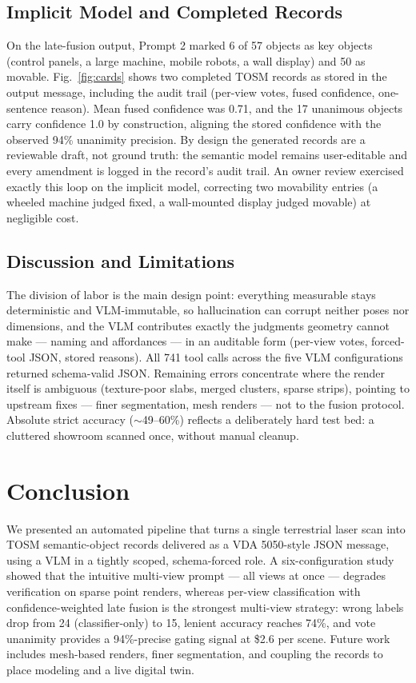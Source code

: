 \documentclass[conference]{IEEEtran}
\begin{document}
\subsection{Implicit Model and Completed Records}
On the late-fusion output, Prompt 2 marked 6 of 57 objects as key objects
(control panels, a large machine, mobile robots, a wall display) and 50 as
movable. Fig.~\ref{fig:cards} shows two completed TOSM records as stored in
the output message, including the audit trail (per-view votes, fused
confidence, one-sentence reason). Mean fused confidence was 0.71, and the
17 unanimous objects carry confidence 1.0 by construction, aligning the
stored confidence with the observed 94\% unanimity precision. By design
the generated records are a reviewable draft, not ground truth: the
semantic model remains user-editable and every amendment is logged in the
record's audit trail. An owner review exercised exactly this loop on the
implicit model, correcting two movability entries (a wheeled machine
judged fixed, a wall-mounted display judged movable) at negligible cost.

\subsection{Discussion and Limitations}
The division of labor is the main design point: everything measurable stays
deterministic and VLM-immutable, so hallucination can corrupt neither poses
nor dimensions, and the VLM contributes exactly the judgments geometry
cannot make --- naming and affordances --- in an auditable form (per-view
votes, forced-tool JSON, stored reasons). All 741 tool calls
across the five VLM configurations returned schema-valid
JSON. Remaining errors concentrate where the render itself is ambiguous
(texture-poor slabs, merged clusters, sparse strips), pointing to upstream
fixes --- finer segmentation, mesh renders --- not to the fusion protocol.
Absolute strict accuracy ($\sim$49--60\%) reflects a deliberately hard
test bed: a cluttered showroom scanned once, without manual cleanup.

\section{Conclusion}
We presented an automated pipeline that turns a single terrestrial laser
scan into TOSM semantic-object records delivered as a VDA 5050-style JSON
message, using a VLM in a tightly scoped, schema-forced role. A
six-configuration study showed that the intuitive multi-view prompt ---
all views at once --- degrades verification on sparse point renders,
whereas per-view classification with confidence-weighted late fusion is the
strongest multi-view strategy: wrong labels drop from 24 (classifier-only)
to 15, lenient accuracy reaches 74\%, and vote unanimity provides a
94\%-precise gating signal at \$2.6 per scene. Future work includes
mesh-based renders, finer segmentation, and coupling the records to place
modeling and a live digital twin.
\end{document}
